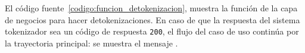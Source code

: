 
El código fuente~\ref{codigo:funcion_detokenizacion}, muestra la función de la
capa de negocios para hacer detokenizaciones. En caso de que la respuesta del
sistema tokenizador sea un código de respuesta \texttt{200}, el flujo del caso
de uso continúa por la trayectoria principal: se muestra el mensaje
.


